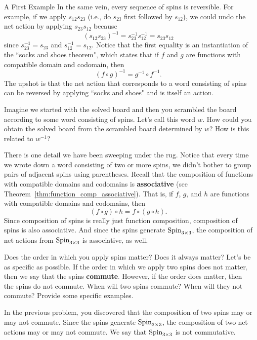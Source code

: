 \begin{section}{A First Example}
In the same vein, every sequence of spins is reversible. For example, if we apply $s_{12} s_{23}$ (i.e., do $s_{23}$ first followed by $s_{12}$), we could undo the net action by applying $s_{23} s_{12}$ because
\[
(s_{12} s_{23})^{-1}=s_{23}^{-1} s_{12}^{-1}=s_{23} s_{12}
\]
since $s_{23}^{-1}=s_{23}$ and $s_{12}^{-1}=s_{12}$.  Notice that the first equality is an instantiation of the ``socks and shoes theorem", which states that if $f$ and $g$ are functions with compatible domain and codomain, then
\[
(f\circ g)^{-1} = g^{-1}\circ f^{-1}.
\]
The upshot is that the net action that corresponds to a word consisting of spins can be reversed by applying ``socks and shoes" and is itself an action.

\begin{problem}
Imagine we started with the solved board and then you scrambled the board according to some word consisting of spins.  Let's call this word $w$. How could you obtain the solved board from the scrambled board determined by $w$? How is this related to $w^{-1}$?
\end{problem}

There is one detail we have been sweeping under the rug.  Notice that every time we wrote down a word consisting of two or more spins, we didn't bother to group pairs of adjacent spins using parentheses.  Recall that the composition of functions with compatible domains and codomains is \textbf{associative} (see Theorem~\ref{thm:function_comp_associative}).  That is, if $f$, $g$, and $h$ are functions with compatible domains and codomains, then
\[
(f\circ g)\circ h = f\circ (g\circ h).
\]
Since composition of spins is really just function composition, composition of spins is also associative.  And since the spins generate $\operatorname{Spin}_{3\times 3}$, the composition of net actions from $\operatorname{Spin}_{3\times 3}$ is associative, as well.

\begin{problem}
Does the order in which you apply spins matter?  Does it always matter?  Let's be as specific as possible.  If the order in which we apply two spins does not matter, then we say that the spins \textbf{commute}.  However, if the order does matter, then the spins do not commute.  When will two spins commute?  When will they not commute?  Provide some specific examples.
\end{problem}

In the previous problem, you discovered that the composition of two spins may or may not commute.  Since the spins generate $\operatorname{Spin}_{3\times 3}$, the composition of two net actions may or may not commute.  We say that $\operatorname{Spin}_{3\times 3}$ is not commutative.


\end{section}
